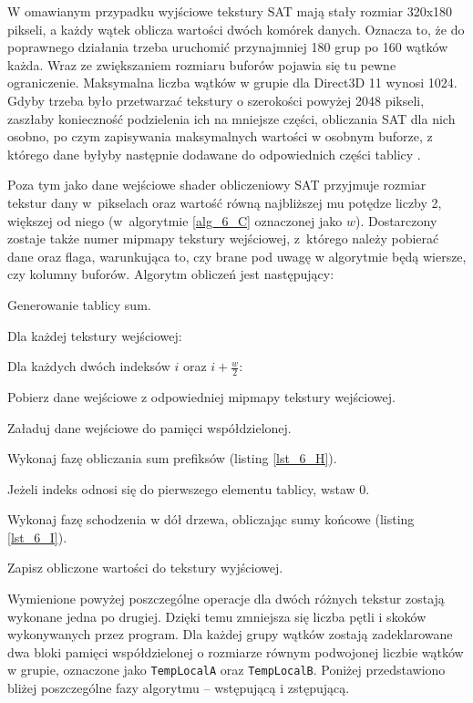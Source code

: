 		W omawianym przypadku wyjściowe tekstury SAT mają stały rozmiar 320x180 pikseli, a każdy wątek oblicza wartości dwóch komórek danych. Oznacza to, że do poprawnego działania trzeba uruchomić przynajmniej 180 grup po 160 wątków każda. Wraz ze zwiększaniem rozmiaru buforów pojawia się tu pewne ograniczenie. Maksymalna liczba wątków w grupie dla Direct3D 11 wynosi 1024. Gdyby trzeba było przetwarzać tekstury o szerokości powyżej 2048 pikseli, zaszłaby konieczność podzielenia ich na mniejsze części, obliczania SAT dla nich osobno, po czym zapisywania maksymalnych wartości w osobnym buforze, z którego dane byłyby następnie dodawane do odpowiednich części tablicy \cite{sat}.
		
		Poza tym jako dane wejściowe shader obliczeniowy SAT przyjmuje rozmiar tekstur dany w~pikselach oraz wartość równą najbliższej mu potędze liczby 2, większej od niego (w~algorytmie \ref{alg_6_C} oznaczonej jako \(w\)). Dostarczony zostaje także numer mipmapy tekstury wejściowej, z~którego należy pobierać dane oraz flaga, warunkująca to, czy brane pod uwagę w algorytmie będą wiersze, czy kolumny buforów. Algorytm obliczeń jest następujący: 
		
		\begin{algorithm}[H]
			\label{alg_6_C}
			\caption{Generowanie tablicy sum.}	
			Dla każdej tekstury wejściowej:
			
			\Indp
			
			Dla każdych dwóch indeksów \(i\) oraz \(i + \frac{w}{2}\):
			
			\Indp
				
				Pobierz dane wejściowe z odpowiedniej mipmapy tekstury wejściowej.
				
				Załaduj dane wejściowe do pamięci współdzielonej.
				
				Wykonaj fazę obliczania sum prefiksów (listing \ref{lst_6_H}).
				
				Jeżeli indeks odnosi się do pierwszego elementu tablicy, wstaw 0.
				
				Wykonaj fazę schodzenia w dół drzewa, obliczając sumy końcowe (listing \ref{lst_6_I}).
				
				Zapisz obliczone wartości do tekstury wyjściowej. 
			
			\Indm		
			
			\Indm
		\end{algorithm}
	
		Wymienione powyżej poszczególne operacje dla dwóch różnych tekstur zostają wykonane jedna po drugiej. Dzięki temu zmniejsza się liczba pętli i skoków wykonywanych przez program. Dla każdej grupy wątków zostają zadeklarowane dwa bloki pamięci współdzielonej o rozmiarze równym podwojonej liczbie wątków w grupie, oznaczone jako \texttt{TempLocalA} oraz \texttt{TempLocalB}. Poniżej przedstawiono bliżej poszczególne fazy algorytmu -- wstępującą i zstępującą.\pagebreak
		
